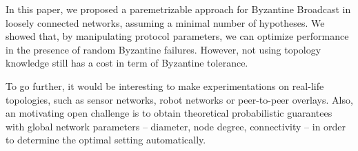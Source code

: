 \documentclass[a4paper,11pt]{article}
\begin{document}
In this paper, we proposed a paremetrizable approach for Byzantine Broadcast in loosely connected networks, assuming a minimal number of hypotheses.
We showed that, by manipulating protocol parameters, we can optimize performance in the presence of random Byzantine failures.
However, not using topology knowledge still has a cost in term of Byzantine tolerance.

To go further, it would be interesting to make experimentations on real-life topologies, such as sensor networks, robot networks or peer-to-peer overlays. Also, an motivating open challenge is to obtain theoretical probabilistic guarantees with global network parameters -- diameter, node degree, connectivity -- in order to determine the optimal setting automatically.



\end{document}
